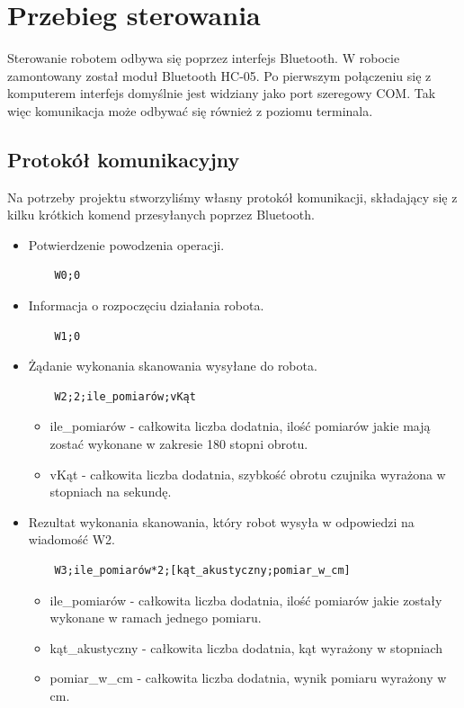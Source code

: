 \documentclass[a4paper]{article}
\begin{document}
\section{Przebieg sterowania}
Sterowanie robotem odbywa się poprzez interfejs Bluetooth. W robocie zamontowany został moduł Bluetooth HC-05. Po pierwszym połączeniu się z komputerem interfejs domyślnie jest widziany jako port szeregowy COM. 
Tak więc komunikacja może odbywać się również z poziomu terminala. 
\subsection{Protokół komunikacyjny}
Na potrzeby projektu stworzyliśmy własny protokół komunikacji, składający się z kilku krótkich komend przesyłanych poprzez Bluetooth. 
\begin{itemize}
\item Potwierdzenie powodzenia operacji. 
\begin{verbatim}
	W0;0
\end{verbatim}
\item Informacja o rozpoczęciu działania robota.
\begin{verbatim}
	W1;0
\end{verbatim}
\item Żądanie wykonania skanowania wysyłane do robota.
\begin{verbatim}
	W2;2;ile_pomiarów;vKąt
\end{verbatim}
	\begin{itemize}
	\item ile\_pomiarów - całkowita liczba dodatnia, ilość pomiarów jakie mają zostać wykonane w zakresie 180 stopni obrotu.
	\item vKąt - całkowita liczba dodatnia, szybkość obrotu czujnika wyrażona w stopniach na sekundę.
	\end{itemize}
\item Rezultat wykonania skanowania, który robot wysyła w odpowiedzi na wiadomość W2.
\begin{verbatim}
	W3;ile_pomiarów*2;[kąt_akustyczny;pomiar_w_cm]
\end{verbatim}
	\begin{itemize}
	\item ile\_pomiarów - całkowita liczba dodatnia, ilość pomiarów jakie zostały wykonane w ramach jednego pomiaru. 
	\item kąt\_akustyczny - całkowita liczba dodatnia, kąt wyrażony w stopniach
	\item pomiar\_w\_cm - całkowita liczba dodatnia, wynik pomiaru wyrażony w cm.

\end{itemize}
\end{itemize}
\end{document}
